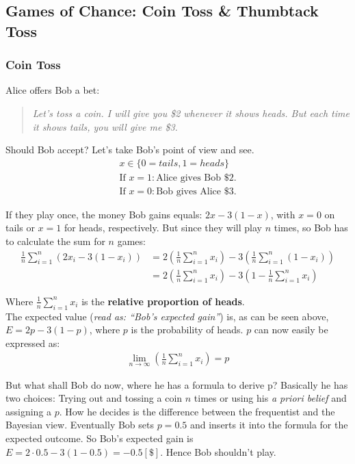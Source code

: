 \subsection{Games of Chance: Coin Toss \& Thumbtack Toss}

\subsubsection*{Coin Toss}

Alice offers Bob a bet: 

\begin{quote}
\textit{Let's toss a coin. I will give you  \$2  whenever it shows heads. But each time it shows tails, you will give me \$3.}
\end{quote}
Should Bob accept? Let's take Bob's point of view and see.
\begin{align*}
x \in \{0 = tails, 1 = heads\}\\
\mbox{If }x = 1: \mbox{Alice gives Bob \$2.}\\
\mbox{If }x = 0: \mbox{Bob gives Alice \$3.}
\end{align*}

If they play once, the money Bob gains equals: $2x - 3 (1 - x)$, with $x = 0$ on tails or $x = 1$ for heads, respectively.
But since they will play $n$ times, so Bob has to calculate the sum for $n$ games:
\begin{align*}
\frac{1}{n} \sum\limits_{i=1}^n \left(2x_i-3\left(1-x_i\right)\right) &= 2\left(\frac{1}{n}\sum\limits_{i=1}^n x_i\right)-3\left(\frac{1}{n}\sum\limits_{i=1}^n \left(1-x_i\right)\right)\\
&= 2\left(\frac{1}{n}\sum\limits_{i=1}^n x_i\right)-3\left(1-\frac{1}{n}\sum\limits_{i=1}^n x_i\right)
\end{align*}

Where $\frac{1}{n}\sum\limits_{i=1}^n x_i$ is the \textbf{relative proportion of heads}.\\
The expected value (\textit{read as: ``Bob's expected gain''}) is, as can be seen above, $E = 2p - 3 (1 - p)$, where $p$ is the probability of heads.
$p$ can now easily be expressed as:
\begin{align*}
\lim_{n\rightarrow\infty}\left(\frac{1}{n}\sum\limits_{i=1}^n x_i\right) = p
\end{align*}

But what shall Bob do now, where he has a formula to derive p? Basically he has two choices: Trying out and tossing a coin $n$ times or using his \textit{a priori belief} and assigning a $p$.
How he decides is the difference between the frequentist and the Bayesian view. 
Eventually Bob sets $p = 0.5$ and inserts it into the formula for the expected outcome.
So Bob's expected gain is $E = 2 \cdot 0.5 - 3 (1 - 0.5) = -0.5 \! \left[ \$ \right] $. Hence Bob shouldn't play.

